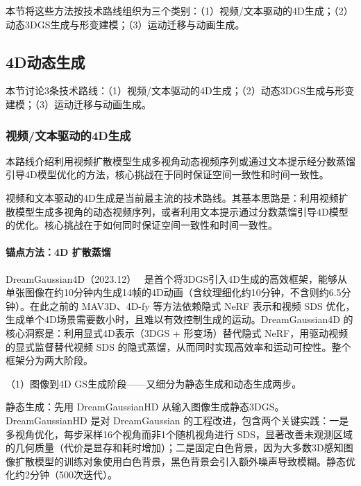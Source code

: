 本节将这些方法按技术路线组织为三个类别：（1）视频/文本驱动的4D生成；（2）动态3DGS生成与形变建模；（3）运动迁移与动画生成。

\subsection{4D动态生成}
\label{sec:08_3_1}

本节讨论3条技术路线：（1）视频/文本驱动的4D生成；（2）动态3DGS生成与形变建模；（3）运动迁移与动画生成。

\subsubsection{视频/文本驱动的4D生成}
\label{sec:08_3_1_1}

本路线介绍利用视频扩散模型生成多视角动态视频序列或通过文本提示经分数蒸馏引导4D模型优化的方法，核心挑战在于同时保证空间一致性和时间一致性。

视频和文本驱动的4D生成是当前最主流的技术路线。其基本思路是：利用视频扩散模型生成多视角的动态视频序列，或者利用文本提示通过分数蒸馏引导4D模型的优化。核心挑战在于如何同时保证空间一致性和时间一致性。

\paragraph{锚点方法：4D 扩散蒸馏}

DreamGaussian4D（2023.12）~\cite{2312_17142} 是首个将3DGS引入4D生成的高效框架，能够从单张图像在约10分钟内生成14帧的4D动画（含纹理细化约10分钟，不含则约6.5分钟）。在此之前的 MAV3D、4D-fy 等方法依赖隐式 NeRF 表示和视频 SDS 优化，生成单个4D场景需要数小时，且难以有效控制生成的运动。DreamGaussian4D 的核心洞察是：利用显式4D表示（3DGS + 形变场）替代隐式 NeRF，用驱动视频的显式监督替代视频 SDS 的隐式蒸馏，从而同时实现高效率和运动可控性。整个框架分为两大阶段。

（1）图像到4D GS生成阶段——又细分为静态生成和动态生成两步。

静态生成：先用 DreamGaussianHD 从输入图像生成静态3DGS。DreamGaussianHD 是对 DreamGaussian 的工程改进，包含两个关键实践：一是多视角优化，每步采样16个视角而非1个随机视角进行 SDS，显著改善未观测区域的几何质量（代价是显存和耗时增加）；二是固定白色背景，因为大多数3D感知图像扩散模型的训练对象使用白色背景，黑色背景会引入额外噪声导致模糊。静态优化约2分钟（500次迭代）。

